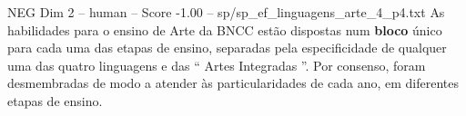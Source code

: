 \begin{textsample}{NEG Dim 2 – human – Score -1.00 – sp/sp\_ef\_linguagens\_arte\_4\_p4.txt}  \label{ex:f2_neg_011}
As habilidades para o ensino de Arte da BNCC estão dispostas num \textbf{bloco} único para cada uma das etapas de ensino, separadas pela especificidade de qualquer uma das quatro linguagens e das “ Artes Integradas ”.
Por consenso, foram desmembradas de modo a atender às particularidades de cada ano, em diferentes etapas de ensino.

\end{textsample}
